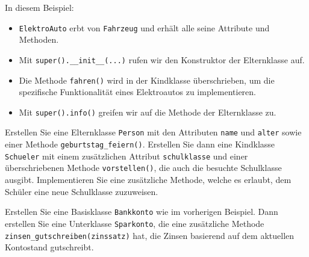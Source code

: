 \begin{myexample}[Vererbung]

\end{myexample}

In diesem Beispiel:
\begin{itemize}
	\item \lstinline|ElektroAuto| erbt von \lstinline|Fahrzeug| und erhält alle seine Attribute und Methoden.
	\item Mit \lstinline|super().__init__(...)| rufen wir den Konstruktor der Elternklasse auf.
	\item Die Methode \lstinline|fahren()| wird in der Kindklasse überschrieben, um die spezifische Funktionalität eines Elektroautos zu implementieren.
	\item Mit \lstinline|super().info()| greifen wir auf die Methode der Elternklasse zu.
\end{itemize}

\begin{myexercise}
	Erstellen Sie eine Elternklasse \lstinline|Person| mit den Attributen \lstinline|name| und \lstinline|alter| sowie einer Methode \lstinline|geburtstag_feiern()|. Erstellen Sie dann eine Kindklasse \lstinline|Schueler| mit einem zusätzlichen Attribut \lstinline|schulklasse| und einer überschriebenen Methode \lstinline|vorstellen()|, die auch die besuchte Schulklasse ausgibt. Implementieren Sie eine zusätzliche Methode, welche es erlaubt, dem Schüler eine neue Schulklasse zuzuweisen.
	\begin{myanswer}
		\leavevmode
		
	\end{myanswer}
\end{myexercise}

\begin{myexercise}
	Erstellen Sie eine Basisklasse \lstinline|Bankkonto| wie im vorherigen Beispiel. Dann erstellen Sie eine Unterklasse \lstinline|Sparkonto|, die eine zusätzliche Methode \lstinline|zinsen_gutschreiben(zinssatz)| hat, die Zinsen basierend auf dem aktuellen Kontostand gutschreibt.

	\begin{myanswer}
		\leavevmode
		
	\end{myanswer}
\end{myexercise}

